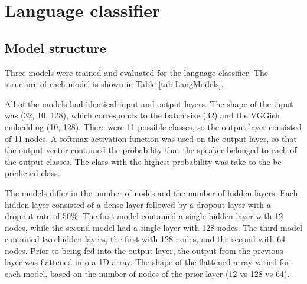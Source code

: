 \documentclass[11pt, letterpaper]{article}
\begin{document}

\section{Language classifier}
\subsection{Model structure}

Three models were trained and evaluated for the language classifier. The structure of each model is shown in Table \ref{tab:LangModels}. 

All of the models had identical input and output layers. The shape of the input was (32, 10, 128), which corresponds to the batch size (32) and the VGGish embedding (10, 128).  There were 11 possible classes, so the output layer consisted of 11 nodes. A softmax activation function was used on the output layer, so that the output vector contained the probability that the speaker belonged to each of the output classes. The class with the highest probability was take to the be predicted class.

The models differ in the number of nodes and the number of hidden layers. Each hidden layer consisted of a dense layer followed by a dropout layer with a dropout rate of 50\%. The first model contained a single hidden layer with 12 nodes, while the second model had a single layer with 128 nodes. The third model contained two hidden layers, the first with 128 nodes, and the second with 64 nodes. Prior to being fed into the output layer, the output from the previous layer was flattened into a 1D array. The shape of the flattened array varied for each model, based on the number of nodes of the prior layer (12 vs 128 vs 64).
\end{document}
